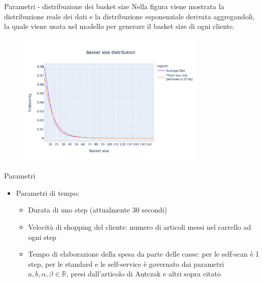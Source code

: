 \begin{frame}{Parametri - distribuzione dei basket size}
	Nella figura viene mostrata la distribuzione reale dei dati e la distribuzione esponenziale derivata aggregandoli, la quale viene usata nel modello per generare il basket size di ogni cliente.
	\begin{figure}[H]
		\centering
		\includegraphics[width=9cm]{"../report/images/basket_size_fitted.png"}
		\label{fig:dist_basket_size}
	\end{figure}
\end{frame}

\begin{frame}{Parametri}
	\begin{itemize}
		\item Parametri di tempo:
		\begin{itemize}
			\item Durata di uno step (attualmente 30 secondi)
			\item Velocità di shopping del cliente: numero di articoli messi nel carrello ad ogni step
			\item Tempo di elaborazione della spesa da parte delle casse: per le self-scan è 1 step, per le standard e le self-service è governato dai parametri $a, b, \alpha, \beta \in \mathbb{R}$, presi dall'articolo di Antczak e altri sopra citato
		\end{itemize}
	\end{itemize}
\end{frame}